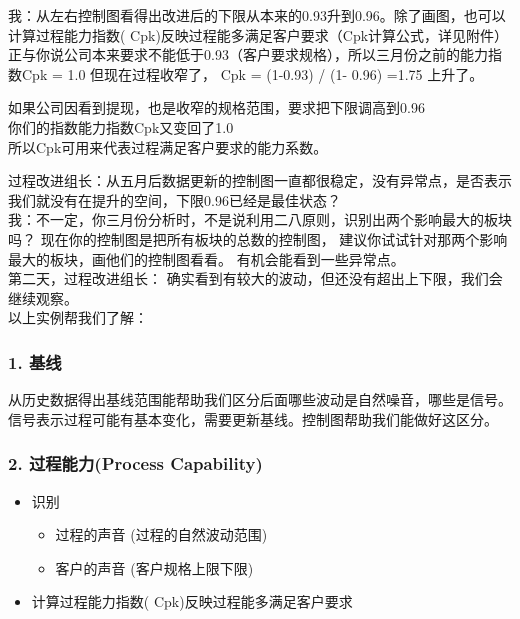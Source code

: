 我：从左右控制图看得出改进后的下限从本来的0.93升到0.96。除了画图，也可以计算过程能力指数(
Cpk)反映过程能多满足客户要求（Cpk计算公式，详见附件）\\
正与你说公司本来要求不能低于0.93（客户要求规格），所以三月份之前的能力指数Cpk
= 1.0 但现在过程收窄了， Cpk = (1-0.93) / (1- 0.96) =1.75 上升了。

如果公司因看到提现，也是收窄的规格范围，要求把下限调高到0.96\\
你们的指数能力指数Cpk又变回了1.0\\
所以Cpk可用来代表过程满足客户要求的能力系数。

过程改进组长：从五月后数据更新的控制图一直都很稳定，没有异常点，是否表示我们就没有在提升的空间，下限0.96已经是最佳状态？\\
我：不一定，你三月份分析时，不是说利用二八原则，识别出两个影响最大的板块吗？
现在你的控制图是把所有板块的总数的控制图，
建议你试试针对那两个影响最大的板块，画他们的控制图看看。
有机会能看到一些异常点。\\
第二天，过程改进组长：
确实看到有较大的波动，但还没有超出上下限，我们会继续观察。\\
以上实例帮我们了解：

\hypertarget{ux57faux7ebf}{%
\subsubsection{1. 基线}\label{ux57faux7ebf}}

从历史数据得出基线范围能帮助我们区分后面哪些波动是自然噪音，哪些是信号。
信号表示过程可能有基本变化，需要更新基线。控制图帮助我们能做好这区分。

\hypertarget{ux8fc7ux7a0bux80fdux529bprocess-capability}{%
\subsubsection{2. 过程能力(Process
Capability)}\label{ux8fc7ux7a0bux80fdux529bprocess-capability}}

\begin{itemize}
\tightlist
\item
  识别

  \begin{itemize}
  \tightlist
  \item
    过程的声音 (过程的自然波动范围)
  \item
    客户的声音 (客户规格上限下限)
  \end{itemize}
\item
  计算过程能力指数( Cpk)反映过程能多满足客户要求
\end{itemize}

